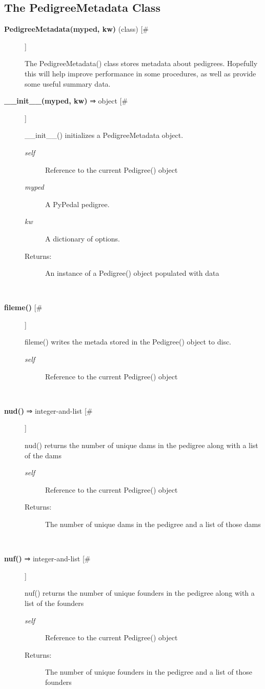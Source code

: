 \documentclass{article}
\begin{document}
\subsection*{The PedigreeMetadata Class}
\begin{description}
\item[\textbf{PedigreeMetadata(myped, kw)} (class) [\#]
]
\par The PedigreeMetadata() class stores metadata about pedigrees.  Hopefully this will help improve performance in some procedures,
as well as provide some useful summary data.

\item[\textbf{\_\_init\_\_(myped, kw)} ⇒ object [\#]
]
\par \_\_init\_\_() initializes a PedigreeMetadata object.
\begin{description}
\item[\textit{self}
]
Reference to the current Pedigree() object
\item[\textit{myped}
]
A PyPedal pedigree.
\item[\textit{kw}
]
A dictionary of options.
\item[Returns:
]
An instance of a Pedigree() object populated with data
\end{description}\\

\item[\textbf{fileme()} [\#]
]
\par fileme() writes the metada stored in the Pedigree() object to disc.
\begin{description}
\item[\textit{self}
]
Reference to the current Pedigree() object
\end{description}\\

\item[\textbf{nud()} ⇒ integer-and-list [\#]
]
\par nud() returns the number of unique dams in the pedigree along with a list of the dams
\begin{description}
\item[\textit{self}
]
Reference to the current Pedigree() object
\item[Returns:
]
The number of unique dams in the pedigree and a list of those dams
\end{description}\\

\item[\textbf{nuf()} ⇒ integer-and-list [\#]
]
\par nuf() returns the number of unique founders in the pedigree along with a list of the founders
\begin{description}
\item[\textit{self}
]
Reference to the current Pedigree() object
\item[Returns:
]
The number of unique founders in the pedigree and a list of those founders
\end{description}\\


\end{description}
\end{document}
